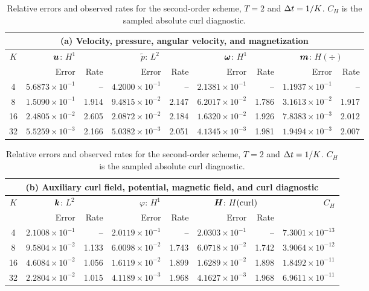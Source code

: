 \begin{table}[htbp]
\centering
\caption{Relative errors and observed rates for the second-order scheme, $T=2$ and $\Delta t=1/K$. $C_H$ is the sampled absolute curl diagnostic.}
\label{tab:second-order-errors}
\begingroup
\small
\setlength{\tabcolsep}{3.5pt}
\renewcommand{\arraystretch}{1.15}
\begin{tabular}{crrrrrrrr}
\toprule
\multicolumn{9}{c}{(a) Velocity, pressure, angular velocity, and magnetization}\\
\midrule
$K$ & \multicolumn{2}{c}{$\boldsymbol u$: $H^1$} & \multicolumn{2}{c}{$\widetilde p$: $L^2$} & \multicolumn{2}{c}{$\boldsymbol\omega$: $H^1$} & \multicolumn{2}{c}{$\boldsymbol m$: $H(\div)$}\\
 & Error & Rate & Error & Rate & Error & Rate & Error & Rate\\
\midrule
4 & $5.6873\!\times\!10^{-1}$ & -- & $4.2000\!\times\!10^{-1}$ & -- & $2.1381\!\times\!10^{-1}$ & -- & $1.1937\!\times\!10^{-1}$ & --\\
8 & $1.5090\!\times\!10^{-1}$ & 1.914 & $9.4815\!\times\!10^{-2}$ & 2.147 & $6.2017\!\times\!10^{-2}$ & 1.786 & $3.1613\!\times\!10^{-2}$ & 1.917\\
16 & $2.4805\!\times\!10^{-2}$ & 2.605 & $2.0872\!\times\!10^{-2}$ & 2.184 & $1.6320\!\times\!10^{-2}$ & 1.926 & $7.8383\!\times\!10^{-3}$ & 2.012\\
32 & $5.5259\!\times\!10^{-3}$ & 2.166 & $5.0382\!\times\!10^{-3}$ & 2.051 & $4.1345\!\times\!10^{-3}$ & 1.981 & $1.9494\!\times\!10^{-3}$ & 2.007\\
\bottomrule
\end{tabular}
\par\medskip
\begin{tabular}{crrrrrrr}
\toprule
\multicolumn{8}{c}{(b) Auxiliary curl field, potential, magnetic field, and curl diagnostic}\\
\midrule
$K$ & \multicolumn{2}{c}{$\boldsymbol k$: $L^2$} & \multicolumn{2}{c}{$\varphi$: $H^1$} & \multicolumn{2}{c}{$\boldsymbol H$: $H(\operatorname{curl})$} & $C_H$\\
 & Error & Rate & Error & Rate & Error & Rate &\\
\midrule
4 & $2.1008\!\times\!10^{-1}$ & -- & $2.0119\!\times\!10^{-1}$ & -- & $2.0303\!\times\!10^{-1}$ & -- & $7.3001\!\times\!10^{-13}$\\
8 & $9.5804\!\times\!10^{-2}$ & 1.133 & $6.0098\!\times\!10^{-2}$ & 1.743 & $6.0718\!\times\!10^{-2}$ & 1.742 & $3.9064\!\times\!10^{-12}$\\
16 & $4.6084\!\times\!10^{-2}$ & 1.056 & $1.6119\!\times\!10^{-2}$ & 1.899 & $1.6289\!\times\!10^{-2}$ & 1.898 & $1.8492\!\times\!10^{-11}$\\
32 & $2.2804\!\times\!10^{-2}$ & 1.015 & $4.1189\!\times\!10^{-3}$ & 1.968 & $4.1627\!\times\!10^{-3}$ & 1.968 & $6.9611\!\times\!10^{-11}$\\
\bottomrule
\end{tabular}
\endgroup
\end{table}

